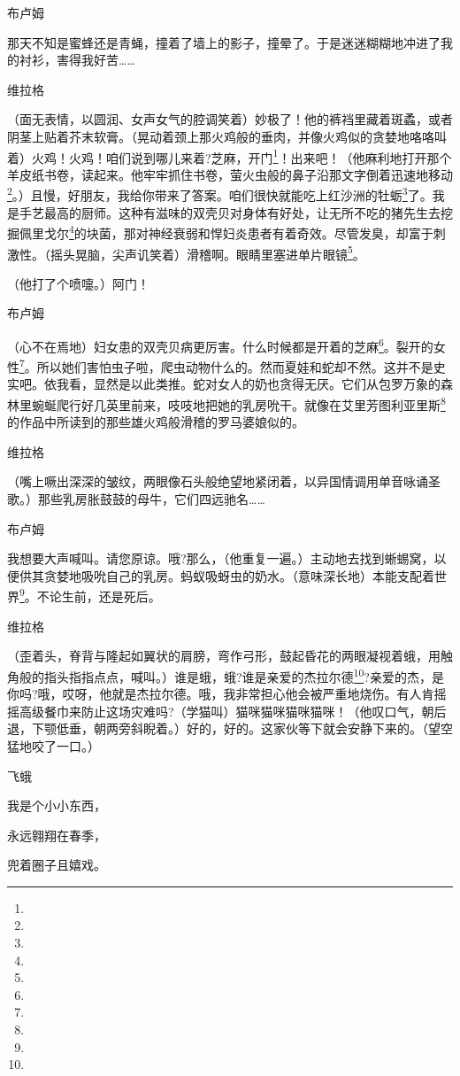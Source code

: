 \par 布卢姆
\par 那天不知是蜜蜂还是青蝇，撞着了墙上的影子，撞晕了。于是迷迷糊糊地冲进了我的衬衫，害得我好苦……
\par 维拉格
\par （面无表情，以圆润、女声女气的腔调笑着）妙极了！他的裤裆里藏着斑蟊，或者阴茎上贴着芥末软膏。（晃动着颈上那火鸡般的垂肉，并像火鸡似的贪婪地咯咯叫着）火鸡！火鸡！咱们说到哪儿来着?芝麻，开门\footnote{}！出来吧！（他麻利地打开那个羊皮纸书卷，读起来。他牢牢抓住书卷，萤火虫般的鼻子沿那文字倒着迅速地移动\footnote{}。）且慢，好朋友，我给你带来了答案。咱们很快就能吃上红沙洲的牡蛎\footnote{}了。我是手艺最高的厨师。这种有滋味的双壳贝对身体有好处，让无所不吃的猪先生去挖掘佩里戈尔\footnote{}的块菌，那对神经衰弱和悍妇炎患者有着奇效。尽管发臭，却富于刺激性。（摇头晃脑，尖声讥笑着）滑稽啊。眼睛里塞进单片眼镜\footnote{}。
\par （他打了个喷嚏。）阿门！
\par 布卢姆
\par （心不在焉地）妇女患的双壳贝病更厉害。什么时候都是开着的芝麻\footnote{}。裂开的女性\footnote{}。所以她们害怕虫子啦，爬虫动物什么的。然而夏娃和蛇却不然。这并不是史实吧。依我看，显然是以此类推。蛇对女人的奶也贪得无厌。它们从包罗万象的森林里蜿蜒爬行好几英里前来，吱吱地把她的乳房吮干。就像在艾里芳图利亚里斯\footnote{}的作品中所读到的那些雄火鸡般滑稽的罗马婆娘似的。
\par 维拉格
\par （嘴上噘出深深的皱纹，两眼像石头般绝望地紧闭着，以异国情调用单音咏诵圣歌。）那些乳房胀鼓鼓的母牛，它们四远驰名……
\par 布卢姆
\par 我想要大声喊叫。请您原谅。哦?那么，（他重复一遍。）主动地去找到蜥蜴窝，以便供其贪婪地吸吮自己的乳房。蚂蚁吸蚜虫的奶水。（意味深长地）本能支配着世界\footnote{}。不论生前，还是死后。
\par 维拉格
\par （歪着头，脊背与隆起如翼状的肩膀，弯作弓形，鼓起昏花的两眼凝视着蛾，用触角般的指头指指点点，喊叫。）谁是蛾，蛾?谁是亲爱的杰拉尔德\footnote{}?亲爱的杰，是你吗?哦，哎呀，他就是杰拉尔德。哦，我非常担心他会被严重地烧伤。有人肯摇摇高级餐巾来防止这场灾难吗?（学猫叫）猫咪猫咪猫咪猫咪！（他叹口气，朝后退，下颚低垂，朝两旁斜睨着。）好的，好的。这家伙等下就会安静下来的。（望空猛地咬了一口。）
\par 飞蛾
\par 我是个小小东西，
\par 永远翱翔在春季，
\par 兜着圈子且嬉戏。
